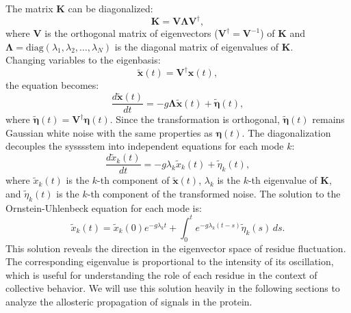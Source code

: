 \documentclass[English, Lau, oneside]{sapthesis}
\begin{document}
The matrix \(\mathbf{K}\) can be diagonalized:
\[
\mathbf{K} = \mathbf{V} \boldsymbol{\Lambda} \mathbf{V}^\dagger,
\]
where \(\mathbf{V}\) is the orthogonal matrix of eigenvectors (\(\mathbf{V}^\dagger = \mathbf{V}^{-1}\)) of \(\mathbf{K}\) 
and \(\boldsymbol{\Lambda} = \text{diag}(\lambda_1, \lambda_2, \dots, \lambda_N)\) is the diagonal matrix of eigenvalues of \(\mathbf{K}\).\\
Changing variables to the eigenbasis:
\[
\tilde{\mathbf{x}}(t) = \mathbf{V}^\dagger \mathbf{x}(t),
\]
the equation becomes:
\[
\frac{d \tilde{\mathbf{x}}(t)}{dt} = - g \boldsymbol{\Lambda} \tilde{\mathbf{x}}(t) + \tilde{\boldsymbol{\eta}}(t),
\]
where \(\tilde{\boldsymbol{\eta}}(t) = \mathbf{V}^\dagger \boldsymbol{\eta}(t)\). Since the transformation is orthogonal, \(\tilde{\boldsymbol{\eta}}(t)\) remains Gaussian white noise with the same properties as \(\boldsymbol{\eta}(t)\).
The diagonalization decouples the sysssstem into independent equations for each mode \(k\):
\[
\frac{d \tilde{x}_k(t)}{dt} = -g \lambda_k \tilde{x}_k(t) + \tilde{\eta}_k(t),
\]
where \(\tilde{x}_k(t)\) is the \(k\)-th component of \(\tilde{\mathbf{x}}(t)\),
\(\lambda_k\) is the \(k\)-th eigenvalue of \(\mathbf{K}\),
and \(\tilde{\eta}_k(t)\) is the \(k\)-th component of the transformed noise.
The solution to the Ornstein-Uhlenbeck equation for each mode is:
\[
\tilde{x}_k(t) = \tilde{x}_k(0) e^{-g \lambda_k t} + \int_0^t e^{-g \lambda_k (t-s)} \tilde{\eta}_k(s) \, ds.
\]
This solution reveals the direction in the eigenvector space of residue fluctuation. The corresponding eigenvalue is proportional to the intensity of its oscillation, which is useful for understanding the role of each residue in the context of collective behavior.
We will use this solution heavily in the following sections to analyze the allosteric propagation of signals in the protein.\\









\newpage
\end{document}

